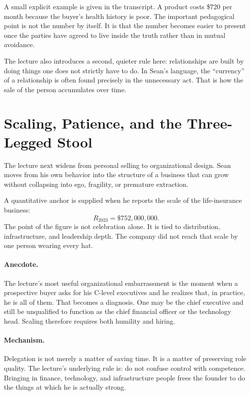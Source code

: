 A small explicit example is given in the transcript. A product costs \$720 per month because the buyer's health history is poor. The important pedagogical point is not the number by itself. It is that the number becomes easier to present once the parties have agreed to live inside the truth rather than in mutual avoidance.

The lecture also introduces a second, quieter rule here: relationships are built by doing things one does not strictly have to do. In Sean's language, the ``currency'' of a relationship is often found precisely in the unnecessary act. That is how the sale of the person accumulates over time.

\section{Scaling, Patience, and the Three-Legged Stool}

The lecture next widens from personal selling to organizational design. Sean moves from his own behavior into the structure of a business that can grow without collapsing into ego, fragility, or premature extraction.

A quantitative anchor is supplied when he reports the scale of the life-insurance business:
\begin{equation}
R_{2023} = \$752{,}000{,}000.
\end{equation}
The point of the figure is not celebration alone. It is tied to distribution, infrastructure, and leadership depth. The company did not reach that scale by one person wearing every hat.

\paragraph{Anecdote.}
The lecture's most useful organizational embarrassment is the moment when a prospective buyer asks for his C-level executives and he realizes that, in practice, he is all of them. That becomes a diagnosis. One may be the chief executive and still be unqualified to function as the chief financial officer or the technology head. Scaling therefore requires both humility and hiring.

\paragraph{Mechanism.}
Delegation is not merely a matter of saving time. It is a matter of preserving role quality. The lecture's underlying rule is: do not confuse control with competence. Bringing in finance, technology, and infrastructure people frees the founder to do the things at which he is actually strong.

